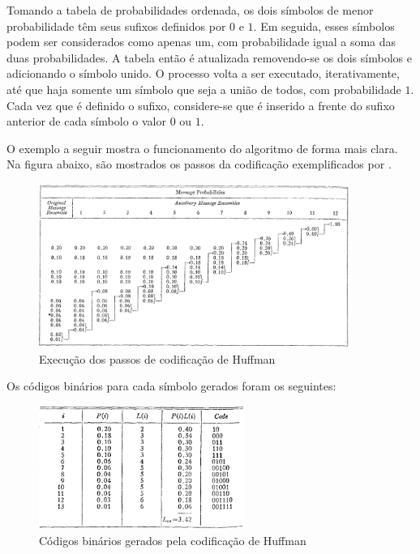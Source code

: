 \documentclass[cic,tc]{iiufrgs}
\begin{document}
Tomando a tabela de probabilidades ordenada, os dois símbolos de menor probabilidade 
têm seus sufixos definidos por $0$ e $1$.
Em seguida, esses símbolos podem ser considerados como apenas um, com probabilidade igual 
a soma das duas probabilidades. 
A tabela então é atualizada removendo-se os dois símbolos e adicionando o símbolo unido. 
O processo volta a ser executado, iterativamente, até que haja somente um símbolo que seja 
a união de todos, com probabilidade $1$.
Cada vez que é definido o sufixo, considere-se que é inserido a frente do sufixo anterior 
de cada símbolo o valor $0$ ou $1$.

O exemplo a seguir mostra o funcionamento do algoritmo de forma mais clara.
Na figura abaixo, são mostrados os passos da codificação exemplificados por 
\citet{HuffmanCoding}.

\begin{figure}[H]
    \caption{Execução dos passos de codificação de Huffman}
    \begin{center}
        \includegraphics[width=0.9\textwidth]{img/huffmanprocess.png}
    \end{center}
\end{figure}

Os códigos binários para cada símbolo gerados foram os seguintes:
\begin{figure}[H]
    \caption{Códigos binários gerados pela codificação de Huffman}
    \begin{center}
        \includegraphics[width=0.6\textwidth]{img/huffmantable.png}
    \end{center}
\end{figure}
\end{document}
